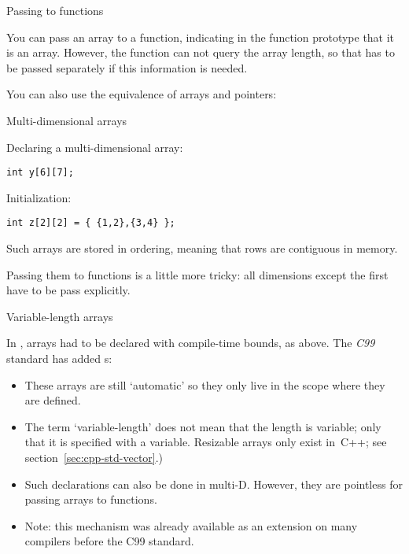  {Passing to functions}

You can pass an array to a function,
indicating in the function prototype that it is an array.
However, the function can not query the array length,
so that has to be passed separately if this information is needed.


You can also use the equivalence of arrays and pointers:


 {Multi-dimensional arrays}

Declaring a multi-dimensional array:
\begin{lstlisting}
int y[6][7];
\end{lstlisting}

Initialization:
\begin{lstlisting}
int z[2][2] = { {1,2},{3,4} };
\end{lstlisting}

Such arrays are stored in  ordering,
meaning that rows are contiguous in memory.


Passing them to functions is a little more tricky:
all dimensions except the first have to be pass explicitly.


 {Variable-length arrays}
\label{sec:c-vla}

In , arrays had to be declared with compile-time bounds,
as above.
The \emph{C99} standard has added s:


\begin{itemize}
\item These arrays are still `automatic' so they only live in the
  scope where they are defined.
\item The term `variable-length' does not mean that the length
  is variable; only that it is specified with a variable.
  Resizable arrays only exist in~C++; see section~\ref{sec:cpp-std-vector}.)
\item 
  Such declarations can also be done in multi-D.
  However, they are pointless for passing arrays to functions.
\item 
  Note: this mechanism was already available as an extension
  on many compilers before the C99 standard.
\end{itemize}

